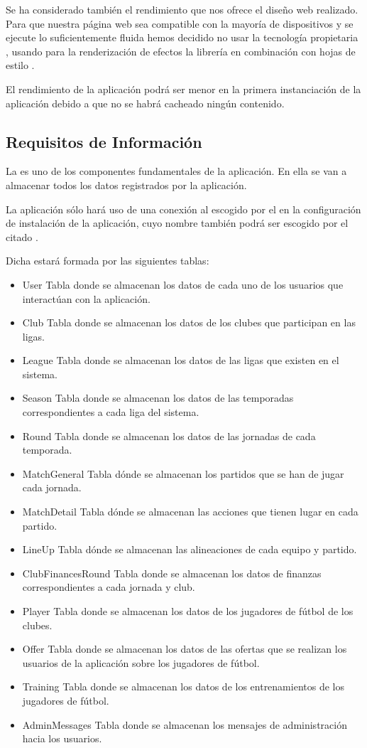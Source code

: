 Se ha considerado también el rendimiento que nos ofrece el diseño web
realizado. Para que nuestra página web sea compatible con la mayoría de
dispositivos y se ejecute lo suficientemente fluida hemos decidido no usar la
tecnología propietaria , usando para la renderización de efectos
la librería  en combinación con hojas de estilo .

El rendimiento de la aplicación podrá ser menor en la primera instanciación de
la aplicación debido a que no se habrá cacheado ningún contenido.

\subsection{Requisitos de Información}
La  es uno de los componentes fundamentales de la
aplicación. En ella se van a almacenar todos los datos registrados por la
aplicación.

La aplicación sólo hará uso de una conexión al  escogido por el
 en la configuración de instalación de la aplicación, cuyo
nombre también podrá ser escogido por el citado .

Dicha  estará formada por las siguientes tablas:

\begin{itemize}
\item User Tabla donde se almacenan los datos de cada uno de los usuarios que
  interactúan con la aplicación.
\item Club Tabla donde se almacenan los datos de los clubes que participan en
  las ligas.
\item League Tabla donde se almacenan los datos de las ligas que existen en el
  sistema.
\item Season Tabla donde se almacenan los datos de las temporadas
  correspondientes a cada liga del sistema.
\item Round Tabla donde se almacenan los datos de las jornadas de cada
  temporada.
\item MatchGeneral Tabla dónde se almacenan los partidos que se han de jugar
  cada jornada.
\item MatchDetail Tabla dónde se almacenan las acciones que tienen lugar en cada
  partido.
\item LineUp Tabla dónde se almacenan las alineaciones de cada equipo y partido.
\item ClubFinancesRound Tabla donde se almacenan los datos de finanzas
  correspondientes a cada jornada y club.
\item Player Tabla donde se almacenan los datos de los jugadores de fútbol de
  los clubes.
\item Offer Tabla donde se almacenan los datos de las ofertas que se realizan
  los usuarios de la aplicación sobre los jugadores de fútbol.
\item Training Tabla donde se almacenan los datos de los entrenamientos de los
  jugadores de fútbol.
\item AdminMessages Tabla donde se almacenan los mensajes de administración
  hacia los usuarios.
\end{itemize}

